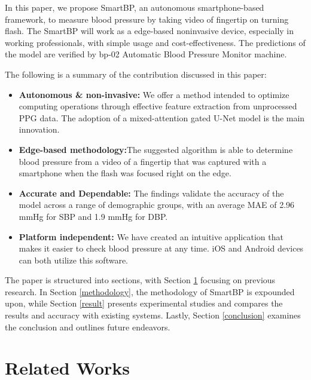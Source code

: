 \documentclass[journal,twoside,web]{ieeecolor}
\begin{document}
In this paper, we propose SmartBP, an autonomous smartphone-based framework, to measure blood pressure by taking video of fingertip on turning flash. The SmartBP will work as a edge-based noninvasive device, especially in working professionals, with simple usage and cost-effectiveness. The predictions of the model are verified by bp-02 Automatic Blood Pressure Monitor machine.

The following is a summary of the contribution discussed in this paper:
\begin{itemize} \item\textbf{Autonomous \& non-invasive: }We offer a method intended to optimize computing operations through effective feature extraction from unprocessed PPG data. The adoption of a mixed-attention gated U-Net model is the main innovation.

    \item \textbf{Edge-based methodology:}The suggested algorithm is able to determine blood pressure from a video of a fingertip that was captured with a smartphone when the flash was focused right on the edge.
    
    \item \textbf{Accurate and Dependable: }The findings validate the accuracy of the model across a range of demographic groups, with an average MAE of 2.96 mmHg for SBP and 1.9 mmHg for DBP.
    
    \item \textbf{Platform independent: }We have created an intuitive application that makes it easier to check blood pressure at any time. iOS and Android devices can both utilize this software.
\end{itemize}

The paper is structured into sections, with Section \ref{related_works} focusing on previous research. In Section \ref{methodology}, the methodology of SmartBP is expounded upon, while Section \ref{result} presents experimental studies and compares the results and accuracy with existing systems. Lastly, Section \ref{conclusion} examines the conclusion and outlines future endeavors.


\section{Related Works}\label{related_works}


\end{document}
